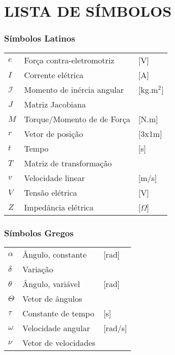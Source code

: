 




\chapter*{LISTA DE SÍMBOLOS}




\subsection*{Símbolos Latinos}

\begin{tabular}{p{}p{}>{\PreserveBacklash\raggedleft}p{}}
$e$             & Força contra-eletromotriz     & {[}V{]}           \tabularnewline    
$I$             & Corrente elétrica             & {[}A{]}           \tabularnewline 
$\mathcal{I}$   & Momento de inércia angular    & {[}kg.m$^2${]}    \tabularnewline
$J$             & Matriz Jacobiana              &                   \tabularnewline
$M$             & Torque/Momento de de Força    & {[}N.m{]}         \tabularnewline
$r$             & Vetor de posição              & {[}3x1m{]}        \tabularnewline
$t$             & Tempo                         & {[}s{]}           \tabularnewline
$T$             & Matriz de transformação       &                   \tabularnewline
$v$             & Velocidade linear             & {[}m/s{]}         \tabularnewline
$V$             & Tensão elétrica               & {[}V{]}           \tabularnewline
$Z$             & Impedância elétrica           & {[}$\Omega${]}    \tabularnewline 
\end{tabular}


\subsection*{Símbolos Gregos}

\begin{tabular}{p{}p{}>{\PreserveBacklash\raggedleft}p{}}
$\alpha$    & Ângulo, constante         & {[}rad{]}     \tabularnewline
$\delta$    & Variação                  &               \tabularnewline
$\theta$    & Ângulo, variável          & {[}rad{]}     \tabularnewline
$\Theta$    & Vetor de ângulos          &               \tabularnewline
$\tau$      & Constante de tempo        & {[}s{]}       \tabularnewline
$\omega$    & Velocidade angular        & {[}rad/s{]}   \tabularnewline
$\nu$       & Vetor de velocidades      &               \tabularnewline
\end{tabular}


